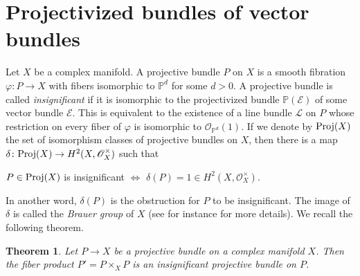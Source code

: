 \documentclass[english,reqno]{amsart}
\newcommand\bbP{{\mathbb P}}
\newcommand\sE{{\mathscr E}}
\newcommand\sL{{\mathscr L}}
\newcommand\sO{{\mathscr O}}
\newcommand{\Br}{{\rm Br}}
\theoremstyle{plain}
\newtheorem{thm}{Theorem}[section]
\theoremstyle{definition}
\numberwithin{equation}{section} %
\begin{document}
\baselineskip






\section{Projectivized bundles of vector bundles}


\label{Examples}

Let $X$ be a complex manifold. A projective bundle $P$ on $X$ is a smooth fibration $\varphi\colon P\rightarrow X$ with fibers isomorphic to  $\bbP^d$ for some $d>0$.
A projective bundle is called \emph{insignificant} if it is isomorphic to the projectivized bundle  $\bbP(\sE)$ of some vector bundle $\sE$. This is equivalent to the existence of a line bundle $\sL$ on $P$ whose restriction on every fiber of $\varphi$ is isomorphic to $\sO_{\bbP^d}(1)$.
If we denote by ${\rm Proj}(X)$ the set of isomorphism classes of projective bundles on $X$, then   there is a map $\delta\colon {\rm Proj}(X)\rightarrow H^2(X,\sO_X^{\times})$  such that
\begin{center}
    $P\in {\rm Proj}(X)$ is insignificant $\Leftrightarrow$ $\delta(P)=1\in H^2(X,\sO_X^{\times}).$
\end{center}
In another word, $\delta(P)$ is the obstruction for $P$ to be insignificant.
The image of $\delta$  is called the \emph{Brauer group} of $X$ (see for instance \cite{Elencwajg1985} for more details).
We recall the following theorem.





\begin{thm}\cite[Theorem~1]{Elencwajg1985}\label{thm:Brauer-group}
    Let $P\rightarrow X$ be a projective bundle on a complex manifold $X$. Then the fiber product $P'=P\times_XP$ is an insignificant projective bundle on $P$.
\end{thm}






\end{document}
